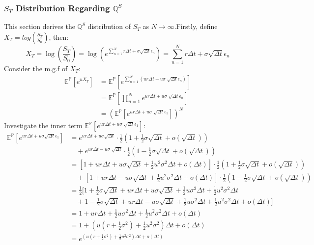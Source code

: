 \documentclass[12pt]{article}
\begin{document}
\subsubsection{$S_T$ Distribution Regarding $\mathbb{Q}^S$}
This section derives the $\mathbb{Q}^S$ distribution of $S_T$ as $N \rightarrow \infty$.Firstly, define $X_T = log(\frac{S_T}{S_0})$, then: 
\[X_T = \log(\frac{S_T}{S_0}) = \log(e^{\sum_{n=1}^N r\Delta t + \sigma \sqrt{\Delta t} \epsilon_n}) = \sum_{n=1}^N r\Delta t + \sigma \sqrt{\Delta t} \epsilon_n \]
Consider the m.g.f of $X_T$:
\begin{align*}
  \mathbb{E}^\mathbb{P}[e^{u X_T}] & =  \mathbb{E}^\mathbb{P}[e^{\sum_{n=1}^N (u r\Delta t+u\sigma \sqrt[]{\Delta t} \epsilon_n)}] \\
  & = \mathbb{E}^\mathbb{P} [\prod_{n=1}^N e^{u r\Delta t+u\sigma \sqrt[]{\Delta t} \epsilon_n}] \\
  & = (\mathbb{E}^\mathbb{P} [e^{u r\Delta t+u\sigma \sqrt[]{\Delta t} \epsilon_1}])^N \tag*{as $\epsilon_n$ is i.i.d}
\end{align*}
Investigate the inner term $\mathbb{E}^\mathbb{P} [e^{u r\Delta t+ u\sigma \sqrt[]{\Delta t} \epsilon_1}]$:
\begin{align*}
  \mathbb{E}^\mathbb{P} [e^{u r\Delta t+u\sigma \sqrt{\Delta t} \epsilon_1}] &= e^{u r\Delta t +u\sigma \sqrt{\Delta t}} \cdot \frac{1}{2} (1 + \frac{1}{2}{\sigma} \sqrt{\Delta t} + o(\sqrt{\Delta t})) \\ 
    & \quad + e^{u r\Delta t-u\sigma \sqrt[]{\Delta t}} \cdot \frac{1}{2} (1 - \frac{1}{2}{\sigma} \sqrt{\Delta t} + o(\sqrt{\Delta t})) \\
    &= [1+u r\Delta t+u \sigma \sqrt{\Delta t} +\frac{1}{2}u^2\sigma^2\Delta t + o(\Delta t)] \cdot \frac{1}{2} (1 + \frac{1}{2}{\sigma} \sqrt{\Delta t} + o(\sqrt{\Delta t})) \\ 
    & \quad + [1+u r\Delta t-u \sigma \sqrt{\Delta t} +\frac{1}{2}u^2\sigma^2\Delta t + o(\Delta t)] \cdot \frac{1}{2} (1 - \frac{1}{2}{\sigma} \sqrt{\Delta t} + o(\sqrt{\Delta t})) \\
    &= \frac{1}{2}[1 + \frac{1}{2}\sigma\sqrt{\Delta t} + ur\Delta t + u\sigma \sqrt{\Delta t} + \frac{1}{2}u\sigma^2\Delta t + \frac{1}{2}u^2\sigma^2\Delta t \\
    & \quad + 1 - \frac{1}{2}\sigma\sqrt{\Delta t} + ur\Delta t - u\sigma \sqrt{\Delta t} + \frac{1}{2}u\sigma^2\Delta t + \frac{1}{2}u^2\sigma^2\Delta t + o(\Delta t)] \\
    &= 1 + ur\Delta t + \frac{1}{2} u\sigma^2\Delta t + \frac{1}{2}u^2\sigma^2\Delta t + o(\Delta t) \\
    &= 1 + (u(r+\frac{1}{2}\sigma^2) + \frac{1}{2}u^2\sigma^2) \Delta t + o(\Delta t) \\
    &= e^{(u(r+\frac{1}{2}\sigma^2) + \frac{1}{2}u^2\sigma^2) \Delta t + o(\Delta t)}
\end{align*}
\end{document}
